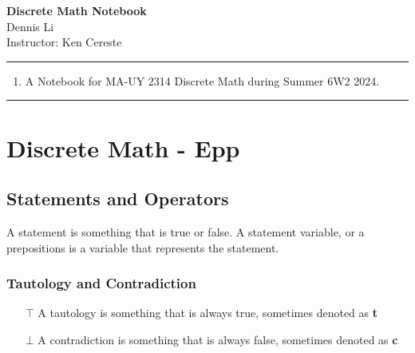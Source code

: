\documentclass[12pt]{book}
\newif\ifshow
\begin{document}
\begin{center}
\ifshow
  \textbf{\Large Homework 0 Solution}\\
\else
  \textbf{\Large Discrete Math Notebook}\\
\fi
Dennis Li\\Instructor: Ken Cereste\\
\end{center}

\hrule

\vspace{0.2cm}

\begin{enumerate}[$\bullet$]  
\item A Notebook for MA-UY 2314 Discrete Math during Summer 6W2 2024. 
\end{enumerate}

\hrule

\vspace{0.5cm}

\tableofcontents


\chapter{Discrete Math - Epp}
\section{Statements and Operators}
A statement is something that is true or false. A statement variable, or a prepositions is a variable that represents the statement. 
\subsection{Tautology and Contradiction}
\begin{enumerate}
    \item[$\top$] A tautology is something that is always true, sometimes denoted as \textbf{t}
    \item[$\bot$] A contradiction is something that is always false, sometimes denoted as \textbf{c}
\end{enumerate}
\end{document}
